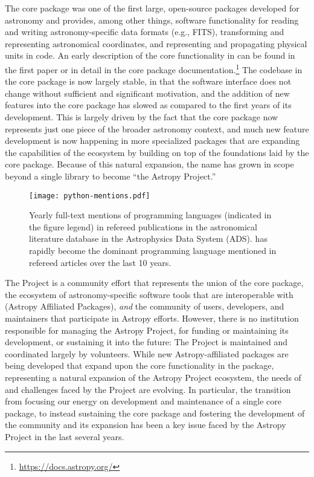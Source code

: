\documentclass[modern]{aastex631}
\begin{document}
The \astropypkg core package was one of the first large, open-source \python
packages developed for astronomy and provides, among other things, software
functionality for reading and writing astronomy-specific data formats (e.g.,
FITS), transforming and representing astronomical coordinates, and representing
and propagating physical units in code.
An early description of the core functionality in \astropypkg can be found in
the first \astropy paper \citep{astropy:2013} or in detail in the core package
documentation.\footnote{\url{https://docs.astropy.org/}}
The codebase in the \astropypkg core package is now largely stable, in that the
software interface does not change without sufficient and significant
motivation, and the addition of new features into the core package has slowed
as compared to the first years of its development.
This is largely driven by the fact that the core package now represents just one
piece of the broader astronomy \python context, and much new feature development
is now happening in more specialized packages that are expanding the
capabilities of the \astropy ecosystem by building on top of the foundations
laid by the \astropypkg core package.
Because of this natural expansion, the name \astropy has grown in scope beyond a
single \python library to become ``the Astropy Project.''

\begin{figure}[th]
    \begin{centering}
      \texttt{[image: python-mentions.pdf]}
        \caption{
            Yearly full-text mentions of programming languages (indicated in the
            figure legend) in refereed publications in the astronomical
            literature database in the Astrophysics Data System (ADS).
            \python has rapidly become the dominant programming language
            mentioned in refereed articles over the last 10 years.
        }
        \label{fig:python-mentions}
    \end{centering}
\end{figure}

The \astropy Project is a community effort that represents the union of the
\astropypkg core package, the ecosystem of astronomy-specific software tools
that are interoperable with \astropypkg (Astropy Affiliated Packages),
\emph{and} the community of users, developers, and maintainers that participate
in Astropy efforts.
However, there is no institution responsible for managing the Astropy Project,
for funding or maintaining its development, or sustaining it into the future:
The Project is maintained and coordinated largely by volunteers.
While new Astropy-affiliated packages are being developed that expand upon the
core functionality in the \astropypkg package, representing a natural expansion
of the Astropy Project ecosystem, the needs of and challenges faced by the
Project are evolving.
In particular, the transition from focusing our energy on development and
maintenance of a single core package, to instead sustaining the core package and
fostering the development of the community and its expansion has been a key
issue faced by the Astropy Project in the last several years.
\end{document}
